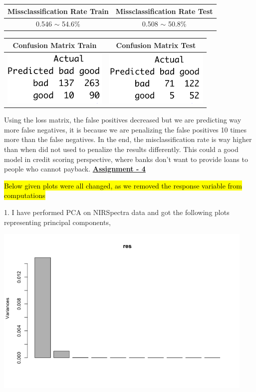 \documentclass[a4paper,10pt]{article}
\begin{document}
\begin{center}
  \begin{tabular}{|c|c|}
    \hline
    \textbf{Missclassification Rate Train} & \textbf{Missclassification Rate Test}\\
    \hline
    0.546 $\sim$ 54.6\% & 0.508 $\sim$ 50.8\%\\
    \hline
  \end{tabular}
  \par
  \begin{tabular}{|c|c|}
    \hline
    \textbf{Confusion Matrix Train} & \textbf{Confusion Matrix Test}\\
    \hline
    \includegraphics[width=50mm,scale=0.10]{Bayes_Loss_Matrix_Train_CM.png} & \includegraphics[width=50mm,scale=0.10]{Bayes_Loss_Matrix_Test_CM.png} \\
    \hline
  \end{tabular}
\end{center} \par
Using the loss matrix, the false positives decreased but we are predicting way more false negatives, it is because we are penalizing the false positives 10 times more than the false negatives.
In the end, the misclassification rate is way higher than when did not used to penalize the results differently. This could a good model in credit scoring 
perspective, where banks don't want to provide loans to people who cannot payback. 
\newpage
\textbf{\underline{Assignment - 4}} \par
\hl{Below given plots were all changed, as we removed the response variable from computations} \par
1. I have performed PCA on NIRSpectra data and got the following plots representing principal components, \par
\begin{center}
  \includegraphics[width=125mm,scale=0.10]{PCA_Variance_Plot.png} 
\end{center}
\end{document}
